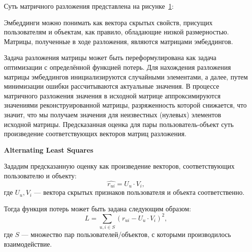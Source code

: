 Суть матричного разложения представлена на рисунке~\ref{fig:mf}:
\begin{figure}[h!]
\caption{}
\label{fig:mf}
\end{figure}

Эмбеддинги можно понимать как вектора скрытых свойств, присущих пользователям и объектам, как правило, обладающие низкой размерностью.
Матрицы, полученные в ходе разложения, являются матрицами эмбеддингов.

Задача разложения матрицы может быть переформулирована как задача оптимизации с определённой функцией потерь.
Для нахождения разложения матрицы эмбеддингов инициализируются случайными элементами, а далее, путем минимизации ошибки рассчитываются актуальные значения.
В процессе матричного разложения значения в исходной матрице аппроксимируются значениями реконструированной матрицы, разряженность которой снижается, что значит, что мы получаем значения для неизвестных (нулевых) элементов исходной матрицы.
Предсказанная оценка для пары пользователь-объект суть произведение соответствующих векторов матриц разложения.

\vspace{1em}
\textbf{Alternating Least Squares}


Зададим предсказанную оценку как произведение векторов, соответствующих пользователю и объекту:
\begin{equation}\label{eq:1}
    \hat{r_{ui}} = U_{u} \cdot V_{i},
\end{equation}
где $U_{u}, V_{i}$ --- вектора скрытых признаков пользователя и объекта соответственно.

Тогда функция потерь может быть задана следующим образом:
\begin{equation}\label{eq:2}
        L = \sum_{u, i\in S}{(r_{ui} - U_{u} \cdot V_{i}) ^ 2},
\end{equation}
где $S$ --- множество пар пользователей/объектов, с которыми производилось взаимодействие.

